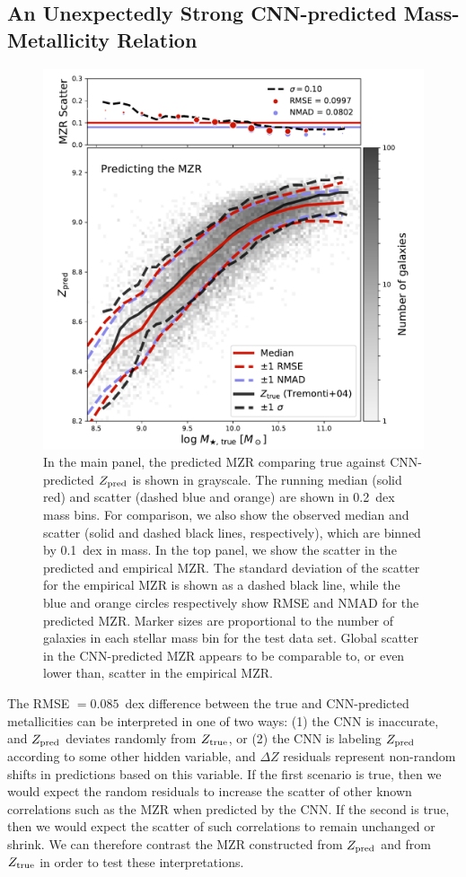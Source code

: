 \documentclass[fleqn,usenatbib]{mnras}
\begin{document}
\subsection{An Unexpectedly Strong CNN-predicted Mass-Metallicity Relation}
\begin{figure}
	\includegraphics[width=\columnwidth]{06-mzr.pdf}
	\caption{\label{fig:mzr}
		In the main panel, the predicted MZR comparing true \mstar{} against CNN-predicted $Z_{\rm pred}$ is shown in grayscale. The running median (solid red) and scatter (dashed blue and orange) are shown in 0.2~dex mass bins. For comparison, we also show the \citet{Tremonti2004} observed median and scatter (solid and dashed black lines, respectively), which are binned by 0.1~dex in mass. In the top panel, we show the scatter in the predicted and empirical MZR. The standard deviation of the scatter for the empirical MZR is shown as a dashed black line, while the blue and orange circles respectively show RMSE and NMAD for the predicted MZR. Marker sizes are proportional to the number of galaxies in each stellar mass bin for the test data set. Global scatter in the CNN-predicted MZR appears to be comparable to, or even lower than, scatter in the empirical MZR.}
\end{figure}

The RMSE $= 0.085$~dex difference between the true and CNN-predicted metallicities can be interpreted in one of two ways: (1) the CNN is inaccurate, and $Z_{\rm pred}$ deviates randomly from $Z_{\rm true}$, or (2) the CNN is labeling $Z_{\rm pred}$ according to some other hidden variable, and $\Delta Z$ residuals represent non-random shifts in predictions based on this variable. If the first scenario is true, then we would expect the random residuals to increase the scatter of other known correlations such as the MZR when predicted by the CNN. If the second is true, then we would expect the scatter of such correlations to remain unchanged or shrink. We can therefore contrast the MZR constructed from $Z_{\rm pred}$ and from $Z_{\rm true}$ in order to test these interpretations.
\end{document}
